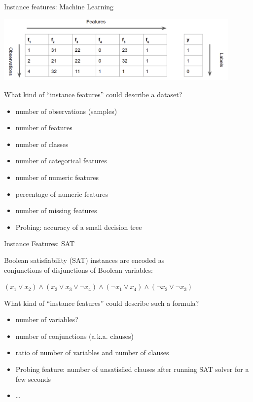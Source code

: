 \begin{frame}[c]{Instance features: Machine Learning}

\begin{center}
\includegraphics[width=0.9\textwidth]{images/ml_data}
\end{center}


What kind of ``instance features'' could describe a dataset? \hands

\pause
\begin{itemize}
  \item number of observations (samples)
  \item number of features
  \item number of classes
  \item number of categorical features
  \item number of numeric features
  \item percentage of numeric features
  \item number of missing features
  \item Probing: accuracy of a small decision tree
\end{itemize}

\end{frame}
\begin{frame}[c]{Instance Features: SAT}

Boolean satisfiability (SAT) instances are encoded as\\ conjunctions of disjunctions of Boolean variables:

$(x_1 \vee x_2)\wedge (x_2 \vee x_3 \vee \neg x_4) \wedge (\neg x_1 \vee x_4) \wedge (\neg x_2 \vee \neg x_3)$

\medskip
\pause
What kind of ``instance features'' could describe such a formula? \hands

\medskip
\pause
\begin{itemize}
  \item number of variables?
  \item number of conjunctions (a.k.a. clauses)
  \item ratio of number of variables and number of clauses
  \pause
  \item Probing feature: number of unsatisfied clauses after running SAT solver for a few seconds 
  \item \ldots
\end{itemize}


\end{frame}
